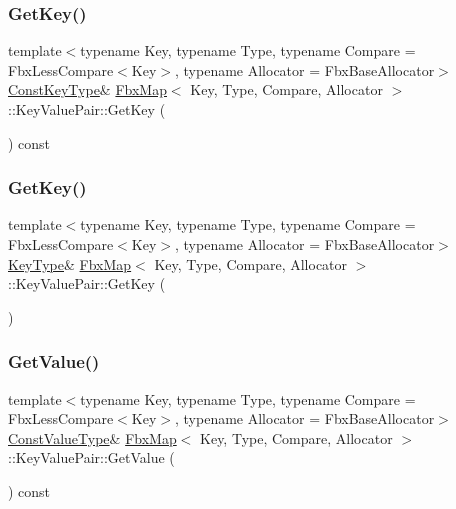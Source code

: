 \subsubsection{\texorpdfstring{Get\+Key()}{GetKey()}\hspace{0.1cm}{\footnotesize\ttfamily [1/2]}}
{\footnotesize\ttfamily template$<$typename Key, typename Type, typename Compare = Fbx\+Less\+Compare$<$\+Key$>$, typename Allocator = Fbx\+Base\+Allocator$>$ \\
\hyperlink{class_fbx_map_1_1_key_value_pair_a74738485dc0b74e76e09dfbcdca9e62e}{Const\+Key\+Type}\& \hyperlink{class_fbx_map}{Fbx\+Map}$<$ Key, Type, Compare, Allocator $>$\+::Key\+Value\+Pair\+::\+Get\+Key (\begin{DoxyParamCaption}{ }\end{DoxyParamCaption}) const}

\mbox{\label{class_fbx_map_1_1_key_value_pair_a68e18fe165bce40f21e0e18eef92978c}} 
\subsubsection{\texorpdfstring{Get\+Key()}{GetKey()}\hspace{0.1cm}{\footnotesize\ttfamily [2/2]}}
{\footnotesize\ttfamily template$<$typename Key, typename Type, typename Compare = Fbx\+Less\+Compare$<$\+Key$>$, typename Allocator = Fbx\+Base\+Allocator$>$ \\
\hyperlink{class_fbx_map_1_1_key_value_pair_a5e685c6ff77cdf31f878e5105737c1a3}{Key\+Type}\& \hyperlink{class_fbx_map}{Fbx\+Map}$<$ Key, Type, Compare, Allocator $>$\+::Key\+Value\+Pair\+::\+Get\+Key (\begin{DoxyParamCaption}{ }\end{DoxyParamCaption})}

\mbox{\label{class_fbx_map_1_1_key_value_pair_a42766d8323b96bc993df3f582ff35313}} 
\subsubsection{\texorpdfstring{Get\+Value()}{GetValue()}\hspace{0.1cm}{\footnotesize\ttfamily [1/2]}}
{\footnotesize\ttfamily template$<$typename Key, typename Type, typename Compare = Fbx\+Less\+Compare$<$\+Key$>$, typename Allocator = Fbx\+Base\+Allocator$>$ \\
\hyperlink{class_fbx_map_1_1_key_value_pair_a13d0030dcec9979f30273cc4ac6ed871}{Const\+Value\+Type}\& \hyperlink{class_fbx_map}{Fbx\+Map}$<$ Key, Type, Compare, Allocator $>$\+::Key\+Value\+Pair\+::\+Get\+Value (\begin{DoxyParamCaption}{ }\end{DoxyParamCaption}) const}


